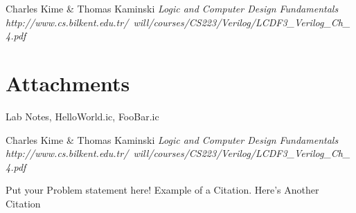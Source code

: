 \documentclass[a4paper,12pt]{article}
\begin{document}
\ifx
\begin{thebibliography}{1}
 Charles Kime \& Thomas Kaminski  \emph{Logic and Computer Design Fundamentals} \\ \hspace{15pt}\textit{http://www.cs.bilkent.edu.tr/~will/courses/CS223/Verilog/LCDF3_Verilog_Ch_4.pdf}
\end{thebibliography}

\section*{Attachments}
Lab Notes, HelloWorld.ic, FooBar.ic

\begin{thebibliography}{9}
 Charles Kime & Thomas Kaminski  \emph{Logic and Computer Design Fundamentals} \textit{http://www.cs.bilkent.edu.tr/~will/courses/CS223/Verilog/LCDF3_Verilog_Ch_4.pdf}
\end{thebibliography}

Put your Problem statement here! Example of a Citation\cite[p.219]{Robotics}. Here's Another Citation\cite{Flueck}
\fi
\end{document}
